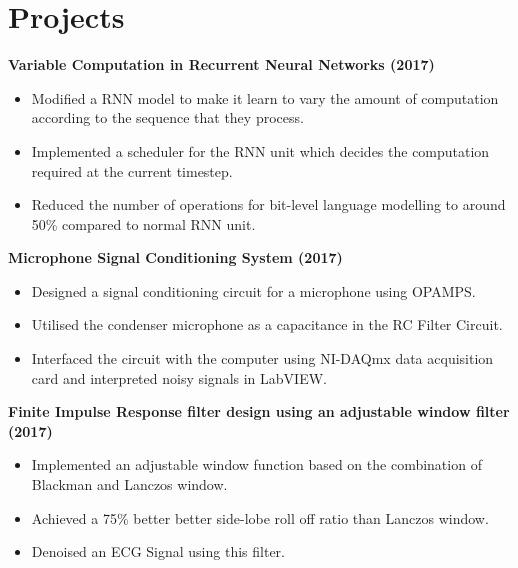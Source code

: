 \documentclass[a4paper]{article}
\newcommand{\resumeItem}[2]{
	\item\small{
		\textbf{#1}{ #2 \vspace{-5pt}}
	}
}
\newcommand{\resumeSubItem}[2]{\resumeItem{#1}{#2}\vspace{-1pt}}
\newcommand{\resumeSubItemOneArg}[1]{\item \small #1\vspace{-1pt}}
\newcommand{\resumeSubHeadingListStart}{\begin{itemize}[leftmargin=*]}
\newcommand{\resumeSubHeadingListEnd}{\end{itemize}}
\newcommand{\resumeItemListStart}{\begin{itemize} \vspace*{-5pt}}
\newcommand{\resumeItemListEnd}{\end{itemize}}
\begin{document}
\section{Projects}
\resumeSubHeadingListStart
\resumeSubItem{Variable Computation in Recurrent Neural Networks (2017)}{
    \resumeItemListStart
    \resumeSubItemOneArg{Modified a RNN model to make it learn to vary the amount of computation according to the sequence that they process.}
    \resumeSubItemOneArg{Implemented a scheduler for the RNN unit which decides the computation required at the current timestep.}
    \resumeSubItemOneArg{Reduced the number of operations for bit-level language modelling to around 50\% compared to normal RNN unit.}
    \resumeItemListEnd
    \vspace{-5pt}
    \resumeSubItem{Microphone Signal Conditioning System (2017)}{
        \resumeItemListStart
        \resumeSubItemOneArg{Designed a signal conditioning circuit for a microphone using OPAMPS.}
        \resumeSubItemOneArg{Utilised the condenser microphone as a capacitance in the RC Filter Circuit. }
        \resumeSubItemOneArg{Interfaced the circuit with the computer using NI-DAQmx data acquisition card and interpreted noisy signals in LabVIEW.}
        \resumeItemListEnd
    }
    \resumeSubItem{Finite Impulse Response filter design using an adjustable window filter  (2017)}{
        \resumeItemListStart
        \resumeSubItemOneArg{Implemented an adjustable window function based on the combination of Blackman and Lanczos window.}
        \resumeSubItemOneArg{Achieved a 75\% better better side-lobe roll off ratio than Lanczos window.}
        \resumeSubItemOneArg{Denoised an ECG Signal using this filter.}
        \resumeItemListEnd
    }

}

\vspace{5pt}
\resumeSubHeadingListEnd

\end{document}
